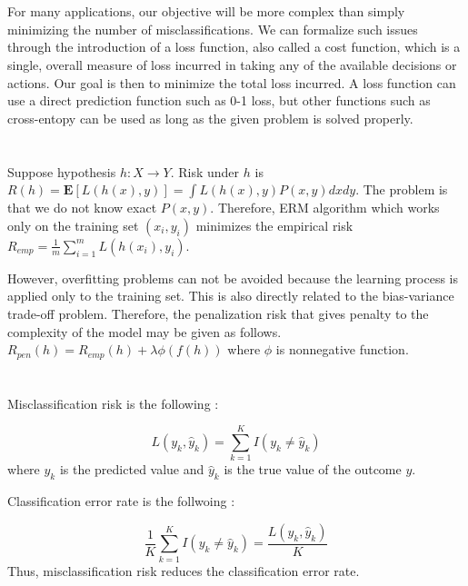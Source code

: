 \documentclass[11pt,a4paper]{article}
\begin{document}
\section{}

For many applications, our objective will be more complex than simply minimizing the number of misclassifications. We can formalize such issues through the introduction of a loss function, also called a cost function, which is a single, overall measure of loss incurred in taking any of the available decisions or actions. Our goal is then to minimize the total loss incurred. A loss function can use a direct prediction function such as 0-1 loss, but other functions such as cross-entopy can be used as long as the given problem is solved properly.

\section{}

Suppose hypothesis \(h : X \rightarrow Y\). Risk under \(h\) is \(R(h)=\mathbf{E}[L(h(x), y)]=\int L(h(x), y)P(x, y)dxdy\). The problem is that we do not know exact \(P(x, y)\). Therefore, ERM algorithm which works only on the training set \((x_i, y_i)\) minimizes the empirical risk \(R_{emp} = \frac{1}{m}\sum_{i=1}^{m}L(h(x_i), y_i)\).

However, overfitting problems can not be avoided because the learning process is applied only to the training set. This is also directly related to the bias-variance trade-off problem. Therefore, the penalization risk that gives penalty to the complexity of the model may be given as follows. \( R_{pen}(h)= R_{emp}(h) + \lambda \phi(f(h))\) where \(\phi\) is nonnegative function.

\section{}

Misclassification risk is the following :

\[L(y_k, \widehat{y}_k) = \sum_{k=1}^KI(y_k\neq\widehat{y}_k)\]
\noindent
where \(y_k\) is the predicted value and \(\widehat{y}_k\) is the true value of the outcome \(y\).

Classification error rate is the follwoing :

\[\frac{1}{K}\sum_{k=1}^KI(y_k\neq\widehat{y}_k) = \frac{L(y_k, \widehat{y}_k)}{K}\]
\noindent
Thus, misclassification risk reduces the classification error rate.
\end{document}
